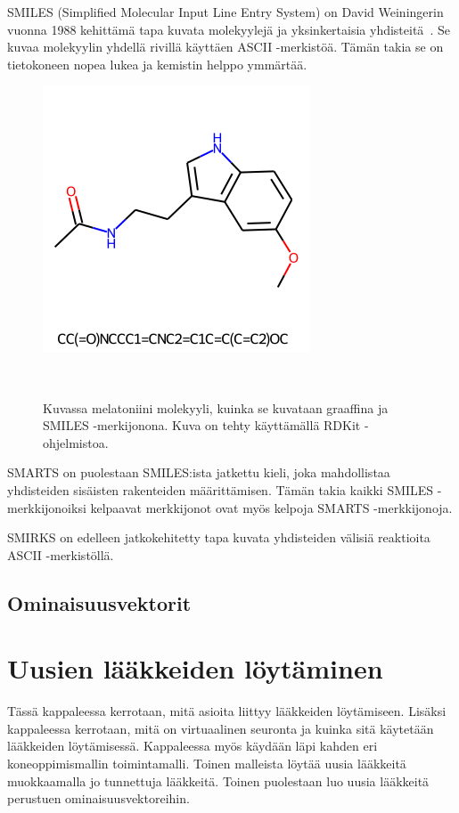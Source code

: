 \documentclass[finnish,twoside,censored,tkt,sw-line]{HYthesisML}
\begin{document}
SMILES (Simplified Molecular Input Line Entry System) on David Weiningerin vuonna 1988 kehittämä tapa kuvata molekyylejä ja yksinkertaisia yhdisteitä~\cite{WeiningerSMILES}.
Se kuvaa molekyylin yhdellä rivillä käyttäen ASCII -merkistöä.
Tämän takia se on tietokoneen nopea lukea ja kemistin helppo ymmärtää.

\begin{figure}
    \centering
    \includegraphics[]{melatonin-smiles.png}
    \caption{Kuvassa melatoniini molekyyli, kuinka se kuvataan graaffina ja SMILES -merkijonona.
        Kuva on tehty käyttämällä RDKit -ohjelmistoa.}
    {~\cite{ShinBonggun}}
\end{figure}

SMARTS on puolestaan SMILES:ista jatkettu kieli, joka mahdollistaa yhdisteiden sisäisten rakenteiden määrittämisen.
Tämän takia kaikki SMILES -merkkijonoiksi kelpaavat merkkijonot ovat myös kelpoja SMARTS -merkkijonoja.

SMIRKS on edelleen jatkokehitetty tapa kuvata yhdisteiden välisiä reaktioita ASCII -merkistöllä.


\section{Ominaisuusvektorit}

\chapter{Uusien lääkkeiden löytäminen}


Tässä kappaleessa kerrotaan, mitä asioita liittyy lääkkeiden löytämiseen.
Lisäksi kappaleessa kerrotaan, mitä on virtuaalinen seuronta ja kuinka sitä käytetään lääkkeiden löytämisessä.
Kappaleessa myös käydään läpi kahden eri koneoppimismallin toimintamalli.
Toinen malleista löytää uusia lääkkeitä muokkaamalla jo tunnettuja lääkkeitä.
Toinen puolestaan luo uusia lääkkeitä perustuen ominaisuusvektoreihin.
\end{document}
